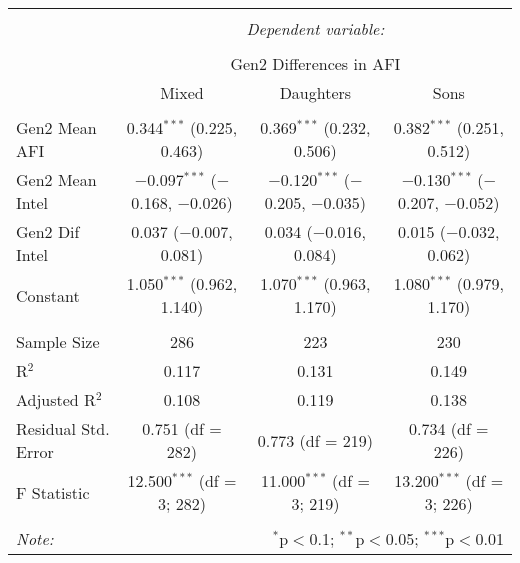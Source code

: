 
\begingroup 
\small 
\begin{tabular}{@{\extracolsep{1pt}}lccc} 
\\[-1.8ex]\hline 
\hline \\[-1.8ex] 
 & \multicolumn{3}{c}{\textit{Dependent variable:}} \\ 
\cline{2-4} 
\\[-1.8ex] & \multicolumn{3}{c}{Gen2 Differences in AFI} \\ 
 & Mixed & Daughters & Sons \\ 
\hline \\[-1.8ex] 
 Gen2 Mean AFI & 0.344$^{***}$ (0.225, 0.463) & 0.369$^{***}$ (0.232, 0.506) & 0.382$^{***}$ (0.251, 0.512) \\ 
  Gen2 Mean Intel & $-$0.097$^{***}$ ($-$0.168, $-$0.026) & $-$0.120$^{***}$ ($-$0.205, $-$0.035) & $-$0.130$^{***}$ ($-$0.207, $-$0.052) \\ 
  Gen2 Dif Intel & 0.037 ($-$0.007, 0.081) & 0.034 ($-$0.016, 0.084) & 0.015 ($-$0.032, 0.062) \\ 
  Constant & 1.050$^{***}$ (0.962, 1.140) & 1.070$^{***}$ (0.963, 1.170) & 1.080$^{***}$ (0.979, 1.170) \\ 
 \hline \\[-1.8ex] 
Sample Size & 286 & 223 & 230 \\ 
R$^{2}$ & 0.117 & 0.131 & 0.149 \\ 
Adjusted R$^{2}$ & 0.108 & 0.119 & 0.138 \\ 
Residual Std. Error & 0.751 (df = 282) & 0.773 (df = 219) & 0.734 (df = 226) \\ 
F Statistic & 12.500$^{***}$ (df = 3; 282) & 11.000$^{***}$ (df = 3; 219) & 13.200$^{***}$ (df = 3; 226) \\ 
\hline 
\hline \\[-1.8ex] 
\textit{Note:}  & \multicolumn{3}{r}{$^{*}$p$<$0.1; $^{**}$p$<$0.05; $^{***}$p$<$0.01} \\ 
\end{tabular} 
\endgroup 
